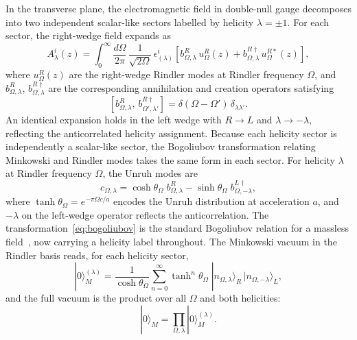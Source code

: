 \documentclass[12pt,a4paper]{article}
\begin{document}
In the transverse plane, the electromagnetic field in double-null gauge decomposes into
two independent scalar-like sectors labelled by helicity $\lambda = \pm 1$. For each sector,
the right-wedge field expands as
\begin{equation}
    A^i_\lambda(z) = \int_0^\infty \frac{d\Omega}{2\pi}\,
        \frac{1}{\sqrt{2\Omega}}\,\epsilon^i_{(\lambda)}
        \left[
            b^R_{\Omega,\lambda}\, u^R_\Omega(z)
            + b^{R\dagger}_{\Omega,\lambda}\, u^{R*}_\Omega(z)
        \right],
\end{equation}
where $u^R_\Omega(z)$ are the right-wedge Rindler modes at Rindler frequency $\Omega$, and
$b^R_{\Omega,\lambda}$, $b^{R\dagger}_{\Omega,\lambda}$ are the corresponding annihilation
and creation operators satisfying
\begin{equation}
    \left[b^R_{\Omega,\lambda},\, b^{R\dagger}_{\Omega',\lambda'}\right]
    = \delta(\Omega - \Omega')\,\delta_{\lambda\lambda'}.
\end{equation}
An identical expansion holds in the left wedge with $R \to L$ and $\lambda \to -\lambda$,
reflecting the anticorrelated helicity assignment. Because each helicity sector is
independently a scalar-like sector, the Bogoliubov transformation relating Minkowski and
Rindler modes takes the same form in each sector. For helicity $\lambda$ at Rindler
frequency $\Omega$, the Unruh modes are
\begin{equation}
    c_{\Omega,\lambda} = \cosh\theta_\Omega\; b^R_{\Omega,\lambda}
                       - \sinh\theta_\Omega\; b^{L\dagger}_{\Omega,-\lambda},
\label{eq:bogoliubov}
\end{equation}
where $\tanh\theta_\Omega = e^{-\pi\Omega c/a}$ encodes the Unruh distribution at acceleration $a$, and $-\lambda$ on the left-wedge operator reflects the anticorrelation. The transformation~\eqref{eq:bogoliubov} is the standard Bogoliubov relation for a massless field~\cite{unruh1976notes, birrell1984quantum}, now carrying a helicity label throughout. The Minkowski vacuum in the Rindler basis reads, for each helicity sector,
\begin{equation}
    |0\rangle_M^{(\lambda)}
    = \frac{1}{\cosh\theta_\Omega}
      \sum_{n=0}^\infty \tanh^n\theta_\Omega\;
      |n_{\Omega,\lambda}\rangle_R\,
      |n_{\Omega,-\lambda}\rangle_L,
\label{eq:vacuum_vec}
\end{equation}
and the full vacuum is the product over all $\Omega$ and both helicities:
\begin{equation}
    |0\rangle_M = \prod_{\Omega,\lambda} |0\rangle_M^{(\lambda)}.
\end{equation}
\end{document}

